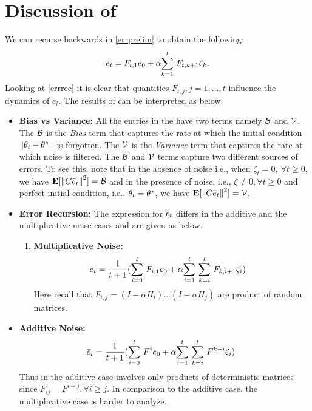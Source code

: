 \section{Discussion of }
We can recurse backwards in \eqref{errprelim} to obtain the following:
\begin{align}\label{errrec}
e_t=F_{t,1}e_0+\alpha\ous{\sum}{k=1}{t} F_{t,k+1}\zeta_k.
\end{align}
Looking at \eqref{errrec} it is clear that quantities $F_{t,j}, j=1,\ldots,t$ influence the dynamics of $e_t$. The results of  can be interpreted as below.
\begin{itemize}[leftmargin=*]
\item \textbf{Bias vs Variance:} All the entries in the  have two terms namely $\B$ and $\V$. The $\B$ is the \emph{Bias} term that captures the rate at which the initial condition $\norm{\theta_t-\ts}$ is forgotten. The $\V$ is the \emph{Variance} term that captures the rate at which noise is filtered. The $\B$ and $\V$ terms capture two different sources of errors. To see this, note that in the absence of noise i.e., when $\zeta_t=0,~\forall t\geq 0$, we have $\E[\norm{C\eb_t}^2]=\B$ and in the presence of noise, i.e., $\zeta\neq 0,\forall t\geq 0$ and perfect initial condition, i.e., $\theta_t=\ts$, we have $\E[\norm{C\eb_t}^2]=\V$.
\item \textbf{Error Recursion:} The expression for $\eb_t$ differs in the additive and the multiplicative noise cases and are given as below.
\begin{enumerate}
\item \textbf{Multiplicative Noise:}
\begin{align}
\eb_t&=\frac{1}{t+1}(\ous{\sum}{i=0}{t} F_{i,1} e_0+ \alpha\ous{\sum}{i=1}{t} \ous{\sum}{k=i}{t} F_{k,i+1}  \zeta_i )
\end{align}
Here recall that $F_{i,j}=(I-\alpha H_i)\ldots (I-\alpha H_j)$ are product of random matrices.
\end{enumerate}
\item \textbf{Additive Noise:}
\begin{align}\label{addexpand}
\eb_t&=\frac{1}{t+1}(\ous{\sum}{i=0}{t} F^i e_0+ \alpha\ous{\sum}{i=1}{t} \ous{\sum}{k=i}{t} F^{k-i}  \zeta_i )
\end{align}
Thus in the additive case involves only products of deterministic matrices since $F_{ij}=F^{i-j},\forall i\geq j$.
In comparison to the additive case, the multiplicative case is harder to analyze.


\end{itemize}
